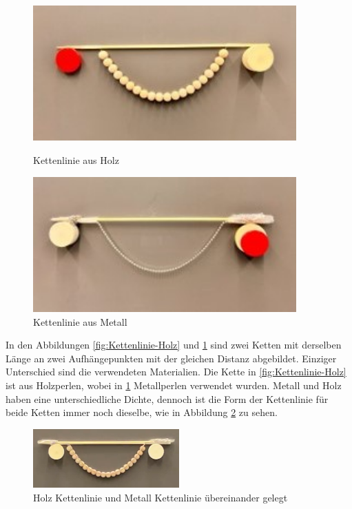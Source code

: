 \begin{figure}
	\centering
	\begin{minipage}{0.45\textwidth}
		\centering
		\includegraphics[width=0.9\textwidth]{papers/kettenlinie/images/kettenlinie_holz.jpg}
		\caption{Kettenlinie aus Holz}
		\label{fig:Kettenlinie-Holz}
	\end{minipage}\hfill
	\begin{minipage}{0.45\textwidth}
		\centering
		\includegraphics[width=0.9\textwidth]{papers/kettenlinie/images/kettenlinie_metall.jpg}
		\caption{Kettenlinie aus Metall}
		\label{fig:Kettenlinie-Metall}
	\end{minipage}
\end{figure}

In den Abbildungen \ref{fig:Kettenlinie-Holz} und \ref{fig:Kettenlinie-Metall} sind zwei Ketten mit derselben Länge an zwei Aufhängepunkten mit der gleichen Distanz abgebildet.
Einziger Unterschied sind die verwendeten Materialien.
Die Kette in \ref{fig:Kettenlinie-Holz} ist aus Holzperlen, wobei in \ref{fig:Kettenlinie-Metall} Metallperlen verwendet wurden.
Metall und Holz haben eine unterschiedliche Dichte, dennoch ist die Form der Kettenlinie für beide Ketten immer noch dieselbe, wie in Abbildung \ref{fig:Kettenlinie-Holz-Metall} zu sehen.

\begin{figure}
	\centering
	\includegraphics[width=0.5\textwidth]{papers/kettenlinie/images/kettenlinie_holz_metall.png}
	\caption{Holz Kettenlinie und Metall Kettenlinie übereinander gelegt}
	\label{fig:Kettenlinie-Holz-Metall}
\end{figure}

